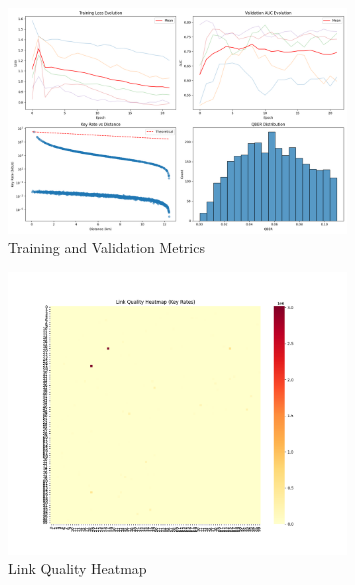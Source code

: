 \documentclass{article}
\begin{document}
    \begin{figure}[H]
    \centering
    \includegraphics[width=0.8\textwidth]{training_metrics.png}
    \caption{Training and Validation Metrics}
    \end{figure}

    \begin{figure}[H]
    \centering
    \includegraphics[width=0.8\textwidth]{link_quality_heatmap.png}
    \caption{Link Quality Heatmap}
    \end{figure}

    
\end{document}

